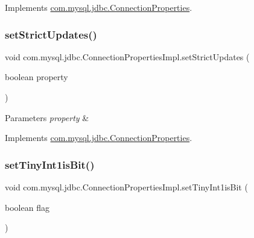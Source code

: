 Implements \mbox{\hyperlink{interfacecom_1_1mysql_1_1jdbc_1_1_connection_properties_afbb6b6808923b1d248ce45db64bafb28}{com.\+mysql.\+jdbc.\+Connection\+Properties}}.

\mbox{\label{classcom_1_1mysql_1_1jdbc_1_1_connection_properties_impl_af4a77c357657267b445886c49a4a5388}} 
\subsubsection{\texorpdfstring{set\+Strict\+Updates()}{setStrictUpdates()}}
{\footnotesize\ttfamily void com.\+mysql.\+jdbc.\+Connection\+Properties\+Impl.\+set\+Strict\+Updates (\begin{DoxyParamCaption}\item[{boolean}]{property }\end{DoxyParamCaption})}


\begin{DoxyParams}{Parameters}
{\em property} & \\
\hline
\end{DoxyParams}


Implements \mbox{\hyperlink{interfacecom_1_1mysql_1_1jdbc_1_1_connection_properties_a6b1583c38f50feb05d85d5f8357a998c}{com.\+mysql.\+jdbc.\+Connection\+Properties}}.

\mbox{\label{classcom_1_1mysql_1_1jdbc_1_1_connection_properties_impl_a6605c6ba04a1e83fb9f0ae6cb527a1fb}} 
\subsubsection{\texorpdfstring{set\+Tiny\+Int1is\+Bit()}{setTinyInt1isBit()}}
{\footnotesize\ttfamily void com.\+mysql.\+jdbc.\+Connection\+Properties\+Impl.\+set\+Tiny\+Int1is\+Bit (\begin{DoxyParamCaption}\item[{boolean}]{flag }\end{DoxyParamCaption})}


